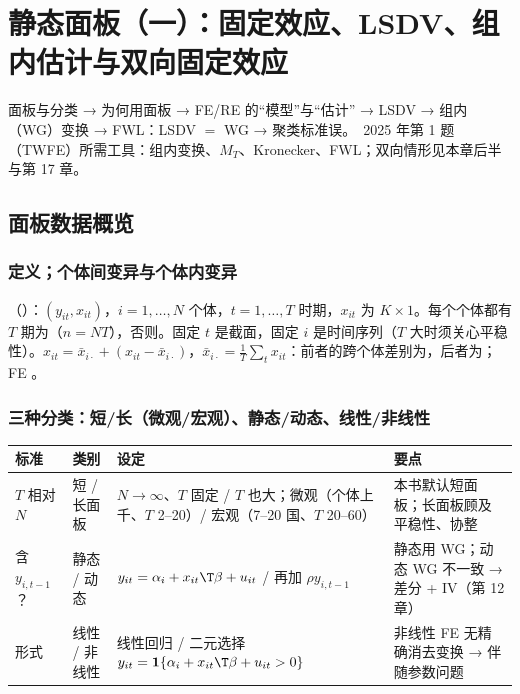 \chapter{静态面板（一）：固定效应、LSDV、组内估计与双向固定效应}
\label{ch:QU10a-panel1}
\noindent{}\quad 面板与分类 → 为何用面板 → FE/RE 的“模型”与“估计” → LSDV → 组内（WG）变换 → FWL：LSDV $=$ WG → 聚类标准误。\tagexam\ 2025 年第 1 题（TWFE）所需工具：组内变换、$M_T$、Kronecker、FWL；双向情形见本章后半与第 17 章。

\section{面板数据概览}

\subsection{定义；个体间变异与个体内变异}
（）：$(y_{it},x_{it})$，$i=1,\dots,N$ 个体，$t=1,\dots,T$ 时期，$x_{it}$ 为 $K\times1$。每个个体都有 $T$ 期为（$n=NT$），否则。固定 $t$ 是截面，固定 $i$ 是时间序列（$T$ 大时须关心平稳性）。$x_{it}=\bar x_{i\cdot}+(x_{it}-\bar x_{i\cdot})$，$\bar x_{i\cdot}=\frac1T\sum_tx_{it}$：前者的跨个体差别为，后者为；FE 。

\subsection{三种分类：短/长（微观/宏观）、静态/动态、线性/非线性}
\begin{center}\footnotesize\renewcommand{\arraystretch}{1.05}
\begin{tabularx}{\linewidth}{@{}p{1.7cm}p{2.3cm}p{6.1cm}L@{}}
\toprule
标准 & 类别 & 设定 & 要点\\
\midrule
$T$ 相对 $N$ & 短 / 长面板 & $N\to\infty$、$T$ 固定 / $T$ 也大；微观（个体上千、$T$ 2–20）/ 宏观（7–20 国、$T$ 20–60） & 本书默认短面板；长面板顾及平稳性、协整\\
含 $y_{i,t-1}$？ & 静态 / 动态 & $y_{it}=\alpha_i+x_{it}\T\beta+u_{it}$ / 再加 $\rho y_{i,t-1}$ & 静态用 WG；动态 WG 不一致 → 差分 + IV（第 12 章）\\
形式 & 线性 / 非线性 & 线性回归 / 二元选择 $y_{it}=\mathbf 1\{\alpha_i+x_{it}\T\beta+u_{it}>0\}$ & 非线性 FE 无精确消去变换 → 伴随参数问题\\
\bottomrule
\end{tabularx}
\end{center}

